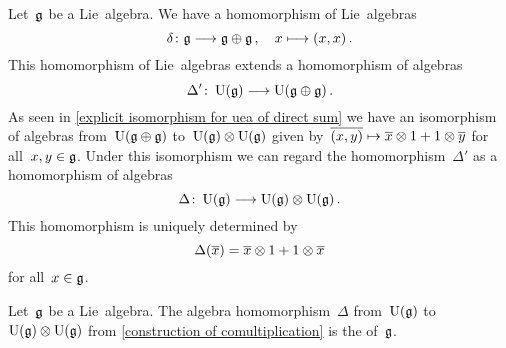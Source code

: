 \begin{construction}
  \label{construction of comultiplication}
  Let~$\mathfrak{g}$ be a Lie~algebra.
  We have a homomorphism of Lie~algebras
  \[
    \delta
    \colon
    \glie
    \to
    \glie \oplus \glie \,,
    \quad
    x
    \mapsto
    (x,x) \,.
  \]
  This homomorphism of Lie~algebras extends a homomorphism of algebras
  \[
    \Delta'
    \colon
    \Univ(\glie)
    \to
    \Univ(\glie \oplus \glie) \,.
  \]
  As seen in \cref{explicit isomorphism for uea of direct sum} we have an isomorphism of algebras from~$\operatorname{U}(\mathfrak{g} \oplus \mathfrak{g})$ to~$\operatorname{U}(\mathfrak{g}) \otimes \operatorname{U}(\mathfrak{g})$ given by~$\class{(x,y)} \mapsto \class{x} \otimes 1 + 1 \otimes \class{y}$ for all~$x, y \in \mathfrak{g}$.
  Under this isomorphism we can regard the homomorphism~$\Delta'$ as a homomorphism of algebras
  \[
    \Delta
    \colon
    \Univ(\glie)
    \to
    \Univ(\glie) \otimes \Univ(\glie) \,.
  \]
  This homomorphism is uniquely determined by
  \[
    \Delta( \overline{x} )
    =
    \overline{x} \otimes 1 + 1 \otimes \overline{x}
  \]
  for all~$x \in \mathfrak{g}$.
\end{construction}


\begin{definition}
  Let~$\mathfrak{g}$ be a Lie~algebra.
  The algebra homomorphism~$\Delta$ from~$\operatorname{U}(\mathfrak{g})$ to~$\operatorname{U}(\mathfrak{g}) \otimes \operatorname{U}(\mathfrak{g})$ from \cref{construction of comultiplication} is the  of~$\mathfrak{g}$.
\end{definition}


